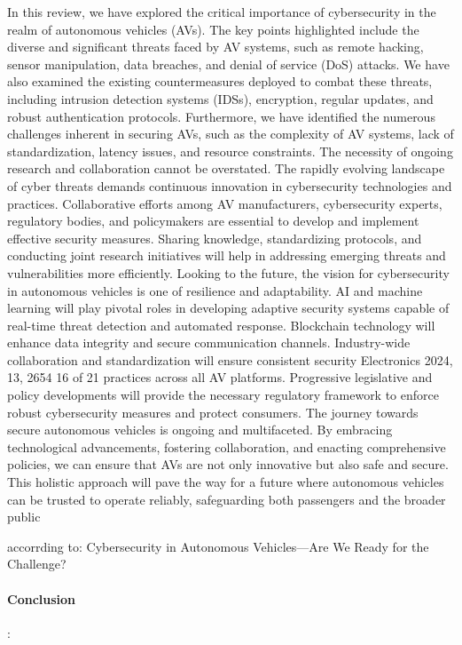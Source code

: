 In this review, we have explored the critical importance of cybersecurity in the realm of
autonomous vehicles (AVs). The key points highlighted include the diverse and significant
threats faced by AV systems, such as remote hacking, sensor manipulation, data breaches,
and denial of service (DoS) attacks. We have also examined the existing countermeasures
deployed to combat these threats, including intrusion detection systems (IDSs), encryption,
regular updates, and robust authentication protocols. Furthermore, we have identified the
numerous challenges inherent in securing AVs, such as the complexity of AV systems, lack
of standardization, latency issues, and resource constraints.
The necessity of ongoing research and collaboration cannot be overstated. The rapidly
evolving landscape of cyber threats demands continuous innovation in cybersecurity technologies and practices. Collaborative efforts among AV manufacturers, cybersecurity
experts, regulatory bodies, and policymakers are essential to develop and implement
effective security measures. Sharing knowledge, standardizing protocols, and conducting joint research initiatives will help in addressing emerging threats and vulnerabilities
more efficiently.
Looking to the future, the vision for cybersecurity in autonomous vehicles is one
of resilience and adaptability. AI and machine learning will play pivotal roles in developing adaptive security systems capable of real-time threat detection and automated
response. Blockchain technology will enhance data integrity and secure communication
channels. Industry-wide collaboration and standardization will ensure consistent security
Electronics 2024, 13, 2654 16 of 21
practices across all AV platforms. Progressive legislative and policy developments will
provide the necessary regulatory framework to enforce robust cybersecurity measures and
protect consumers.
The journey towards secure autonomous vehicles is ongoing and multifaceted. By
embracing technological advancements, fostering collaboration, and enacting comprehensive policies, we can ensure that AVs are not only innovative but also safe and secure. This
holistic approach will pave the way for a future where autonomous vehicles can be trusted
to operate reliably, safeguarding both passengers and the broader public

accorrding to: Cybersecurity in Autonomous Vehicles—Are We Ready for
the Challenge?


\paragraph{Conclusion}:

